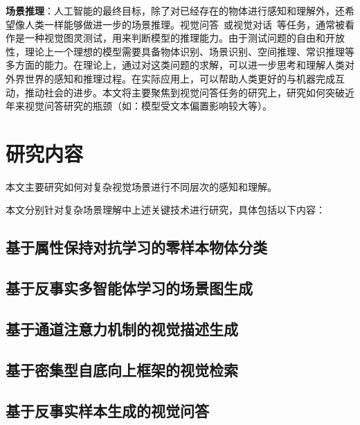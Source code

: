 \begin{asparaenum}
\item \textbf{场景推理}：人工智能的最终目标，除了对已经存在的物体进行感知和理解外，还希望像人类一样能够做进一步的场景推理。视觉问答~\cite{antol2015vqa}或视觉对话~\cite{das2017visual}等任务，通常被看作是一种视觉图灵测试，用来判断模型的推理能力。由于测试问题的自由和开放性，理论上一个理想的模型需要具备物体识别、场景识别、空间推理、常识推理等多方面的能力。在理论上，通过对这类问题的求解，可以进一步思考和理解人类对外界世界的感知和推理过程。在实际应用上，可以帮助人类更好的与机器完成互动，推动社会的进步。本文将主要聚焦到视觉问答任务的研究上，研究如何突破近年来视觉问答研究的瓶颈（如：模型受文本偏置影响较大等）。

\end{asparaenum}

\section{研究内容}
本文主要研究如何对复杂视觉场景进行不同层次的感知和理解。

本文分别针对复杂场景理解中上述关键技术进行研究，具体包括以下内容：



\subsection{基于属性保持对抗学习的零样本物体分类}

\subsection{基于反事实多智能体学习的场景图生成}

\subsection{基于通道注意力机制的视觉描述生成}

\subsection{基于密集型自底向上框架的视觉检索}


\subsection{基于反事实样本生成的视觉问答}


